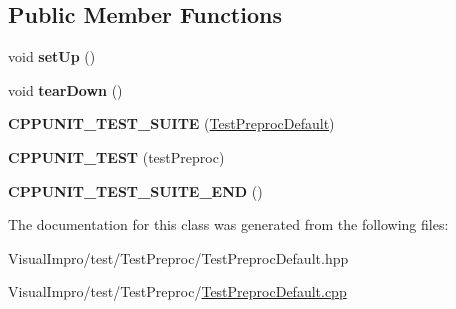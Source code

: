 \subsection*{Public Member Functions}
\begin{DoxyCompactItemize}
\item 
\mbox{\label{class_test_preproc_default_a923befa2eaa0c7e2e7d2d8a8e9d5078f}} 
void {\bfseries set\+Up} ()
\item 
\mbox{\label{class_test_preproc_default_a67141be71f4071988515564f34525c06}} 
void {\bfseries tear\+Down} ()
\item 
\mbox{\label{class_test_preproc_default_a91ff6a785fdd4477a44a4281a14b1353}} 
{\bfseries C\+P\+P\+U\+N\+I\+T\+\_\+\+T\+E\+S\+T\+\_\+\+S\+U\+I\+TE} (\mbox{\hyperlink{class_test_preproc_default}{Test\+Preproc\+Default}})
\item 
\mbox{\label{class_test_preproc_default_a6a4c1e60d71a94456295c418fee0f268}} 
{\bfseries C\+P\+P\+U\+N\+I\+T\+\_\+\+T\+E\+ST} (test\+Preproc)
\item 
\mbox{\label{class_test_preproc_default_ac7004089890c1b0edb4a903a8a2845e4}} 
{\bfseries C\+P\+P\+U\+N\+I\+T\+\_\+\+T\+E\+S\+T\+\_\+\+S\+U\+I\+T\+E\+\_\+\+E\+ND} ()
\end{DoxyCompactItemize}


The documentation for this class was generated from the following files\+:\begin{DoxyCompactItemize}
\item 
Visual\+Impro/test/\+Test\+Preproc/Test\+Preproc\+Default.\+hpp\item 
Visual\+Impro/test/\+Test\+Preproc/\mbox{\hyperlink{_test_preproc_default_8cpp}{Test\+Preproc\+Default.\+cpp}}\end{DoxyCompactItemize}
